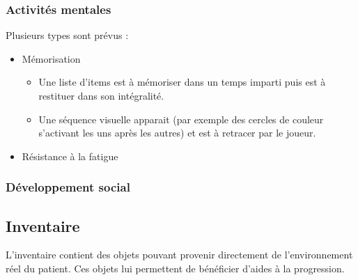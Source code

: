 \documentclass[a4paper,12pt,francais]{article}
\begin{document}
\subsubsection{Activités mentales}
Plusieurs types sont prévus :
\begin{itemize}
	\item Mémorisation
		\begin{itemize}
			\item Une liste d'items est à mémoriser dans un temps imparti puis est à restituer dans son intégralité.
			\item Une séquence visuelle apparait (par exemple des cercles de couleur s'activant les uns après les autres) et est à retracer par le joueur.
		\end{itemize}
	\item Résistance à la fatigue
\end{itemize}
\subsubsection{Développement social}
\subsection{Inventaire}
L'inventaire contient des objets pouvant provenir directement de l'environnement réel du patient. Ces objets lui permettent de bénéficier d'aides à la progression.
\end{document}
